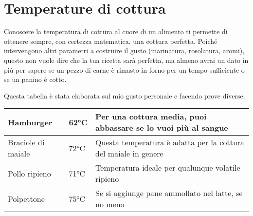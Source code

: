 \section{Temperature di cottura}
Conoscere la temperatura di cottura al cuore di un alimento ti permette di ottenere sempre, con certezza matematica, una cottura perfetta. Poiché intervengono altri parametri a costruire il gusto (marinatura, rosolatura, aromi), questo non vuole dire che la tua ricetta sarà perfetta, ma almeno avrai un dato in più per sapere se un pezzo di carne è rimasto in forno per un tempo sufficiente o se un panino è cotto.

Questa tabella è stata elaborata sul mio gusto personale e facendo prove diverse.





\begin{tabular}{|l|l|l|}
\hline
Hamburger & 62°C & Per una cottura media, puoi abbassare se lo vuoi più al sangue\\
\hline
Braciole di maiale & 72°C & Questa temperatura è adatta per la cottura del maiale in genere\\
\hline
	Pollo ripieno & 71°C & Temperatura ideale per qualunque volatile ripieno\\
	\hline
	Polpettone & 75°C & Se si aggiunge pane ammollato nel latte, se no meno\\
	\hline
\end{tabular}
